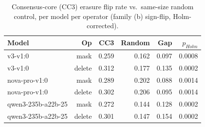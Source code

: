 \begin{table}[t]
\centering
\caption{Consensus-core (CC3) erasure flip rate vs.\ same-size random control, per model per operator (family (b) sign-flip, Holm-corrected).}
\label{tab:erasure}
\begin{tabular}{lrrrrr}
\toprule
Model & Op & CC3 & Random & Gap & $p_{Holm}$ \\
\midrule
v3-v1:0 & mask & 0.259 & 0.162 & 0.097 & 0.0008 \\
v3-v1:0 & delete & 0.312 & 0.177 & 0.135 & 0.0002 \\
nova-pro-v1:0 & mask & 0.289 & 0.202 & 0.088 & 0.0014 \\
nova-pro-v1:0 & delete & 0.302 & 0.206 & 0.095 & 0.0014 \\
qwen3-235b-a22b-25 & mask & 0.272 & 0.144 & 0.128 & 0.0002 \\
qwen3-235b-a22b-25 & delete & 0.301 & 0.147 & 0.154 & 0.0002 \\
\bottomrule
\end{tabular}
\end{table}
